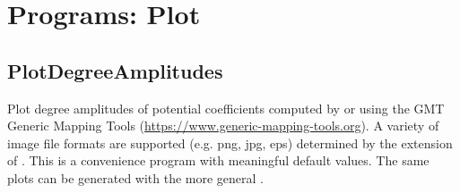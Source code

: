 \section{Programs: Plot}
\subsection{PlotDegreeAmplitudes}\label{PlotDegreeAmplitudes}
Plot degree amplitudes of potential coefficients computed by 
or  using the GMT Generic Mapping Tools
(\url{https://www.generic-mapping-tools.org}).
A variety of image file formats are supported (e.g. png, jpg, eps) determined by the extension of .
This is a convenience program with meaningful default values. The same plots can be generated with the more general .



